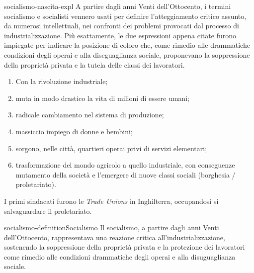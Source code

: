 \documentclass[preview]{standalone}
\begin{document}
\begin{snippet}{socialismo-nascita-expl}
    A partire dagli anni Venti dell'Ottocento, i termini socialismo e socialisti vennero usati per
    definire l'atteggiamento critico assunto, da numerosi intellettuali, nei confronti dei
    problemi provocati dal processo di industrializzazione. Più esattamente, le due espressioni
    appena citate furono impiegate per indicare la posizione di coloro che, come rimedio alle
    drammatiche condizioni degli operai e alla diseguaglianza sociale, proponevano la
    soppressione della proprietà privata e la tutela delle classi dei lavoratori.

    \begin{enumerate}
        \item Con la rivoluzione industriale;
        \item muta in modo drastico la vita di milioni di essere umani;
        \item radicale cambiamento nel sistema di produzione;
        \item massiccio impiego di donne e bembini;
        \item sorgono, nelle città, quartieri operai privi di servizi elementari;
        \item trasformazione del mondo agricolo a quello industriale, con conseguenze mutamento della società e l'emergere di nuove classi sociali (borghesia / proletariato).
    \end{enumerate}
    
    I primi sindacati furono le \textit{Trade Unions} in Inghilterra, occupandosi si salvaguardare il proletariato.
\end{snippet}

\begin{snippetdefinition}{socialismo-definition}{Socialismo}
    Il socialismo, a partire dagli anni Venti dell'Ottocento, rappresentava una reazione critica all'industrializzazione, sostenendo la soppressione della proprietà privata e la protezione dei lavoratori come rimedio alle condizioni drammatiche degli operai e alla disuguaglianza sociale.
\end{snippetdefinition}
\end{document}
